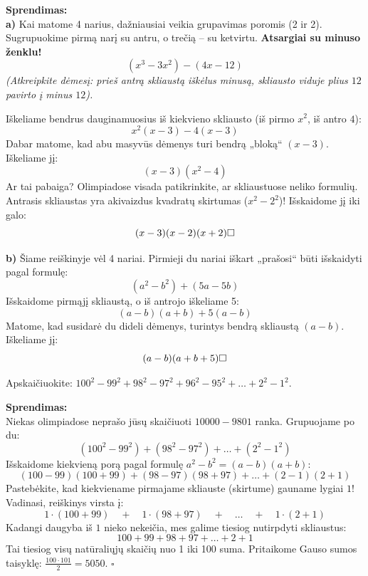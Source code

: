 \documentclass[11pt,a4paper]{scrartcl}
\begin{document}
\textbf{Sprendimas:}\\
\textbf{a)} Kai matome 4 narius, dažniausiai veikia grupavimas poromis (2 ir 2). Sugrupuokime pirmą narį su antru, o trečią – su ketvirtu. \textbf{Atsargiai su minuso ženklu!}
\[ (x^3 - 3x^2) - (4x - 12) \]
\textit{(Atkreipkite dėmesį: prieš antrą skliaustą iškėlus minusą, skliausto viduje plius $12$ pavirto į minus $12$).}

Iškeliame bendrus dauginamuosius iš kiekvieno skliausto (iš pirmo $x^2$, iš antro $4$):
\[ x^2(x - 3) - 4(x - 3) \]
Dabar matome, kad abu masyvūs dėmenys turi bendrą „bloką“ $(x - 3)$. Iškeliame jį:
\[ (x - 3)(x^2 - 4) \]
Ar tai pabaiga? Olimpiadose visada patikrinkite, ar skliaustuose neliko formulių. Antrasis skliaustas yra akivaizdus kvadratų skirtumas ($x^2 - 2^2$)! Išskaidome jį iki galo:
\[ (x - 3)(x - 2)(x + 2) \hfill \square \]

\textbf{b)} Šiame reiškinyje vėl 4 nariai. Pirmieji du nariai iškart „prašosi“ būti išskaidyti pagal formulę:
\[ (a^2 - b^2) + (5a - 5b) \]
Išskaidome pirmąjį skliaustą, o iš antrojo iškeliame 5:
\[ (a - b)(a + b) + 5(a - b) \]
Matome, kad susidarė du dideli dėmenys, turintys bendrą skliaustą $(a - b)$. Iškeliame jį:
\[ (a - b)(a + b + 5) \hfill \square \]


\begin{example}
Apskaičiuokite: $100^2 - 99^2 + 98^2 - 97^2 + 96^2 - 95^2 + \dots + 2^2 - 1^2$.
\end{example}

\textbf{Sprendimas:}\\
Niekas olimpiadose neprašo jūsų skaičiuoti $10000 - 9801$ ranka. Grupuojame po du:
\[ (100^2 - 99^2) + (98^2 - 97^2) + \dots + (2^2 - 1^2) \]
Išskaidome kiekvieną porą pagal formulę $a^2 - b^2 = (a-b)(a+b)$:
\[ (100-99)(100+99) + (98-97)(98+97) + \dots + (2-1)(2+1) \]
Pastebėkite, kad kiekviename pirmajame skliauste (skirtume) gauname lygiai $1$! 
Vadinasi, reiškinys virsta į:
\[ 1 \cdot (100+99) \quad + \quad 1 \cdot (98+97) \quad + \quad \dots \quad + \quad 1 \cdot (2+1) \]
Kadangi daugyba iš $1$ nieko nekeičia, mes galime tiesiog nutirpdyti skliaustus:
\[ 100 + 99 + 98 + 97 + \dots + 2 + 1 \]
Tai tiesiog visų natūraliųjų skaičių nuo 1 iki 100 suma. Pritaikome Gauso sumos taisyklę: $\frac{100 \cdot 101}{2} = 5050$. \hfill $\square$
\end{document}
